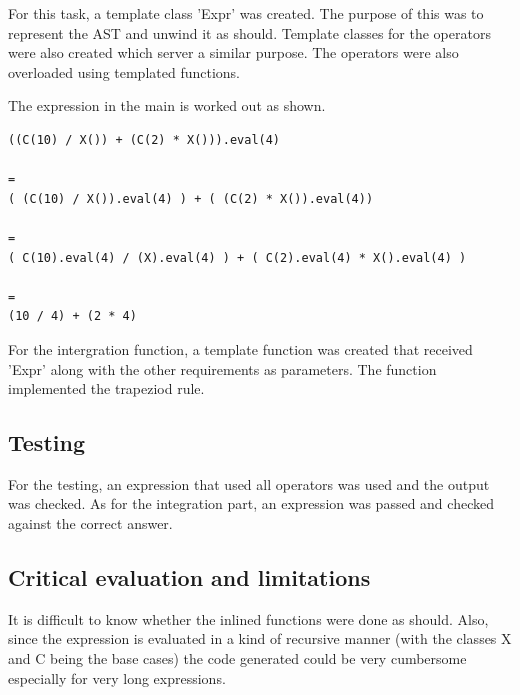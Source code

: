 \documentclass[a4paper, 12pt]{report}
\begin{document}
For this task, a template class  'Expr' was created. The purpose of this was to represent the AST and unwind it as should. Template classes for the operators were also created which server a similar purpose. The operators were also overloaded using templated functions.

The expression in the main is worked out as shown.

\begin{lstlisting}[frame = single, caption = Example of an expression]
((C(10) / X()) + (C(2) * X())).eval(4)

=
( (C(10) / X()).eval(4) ) + ( (C(2) * X()).eval(4))

=
( C(10).eval(4) / (X).eval(4) ) + ( C(2).eval(4) * X().eval(4) )

=
(10 / 4) + (2 * 4)
\end{lstlisting}

For the intergration function, a template function was created that received 'Expr' along with the other requirements as parameters. The function implemented the trapeziod rule.

\subsection{Testing}

For the testing, an expression that used all operators was used and the output was checked. As for the integration part, an expression was passed and checked against the correct answer.

\subsection{Critical evaluation and limitations}
It is difficult to know whether the inlined functions were done as should. Also, since the expression is evaluated in a kind of recursive manner (with the classes X  and  C being the base cases) the code generated could be very cumbersome especially for very long expressions.
\end{document}
